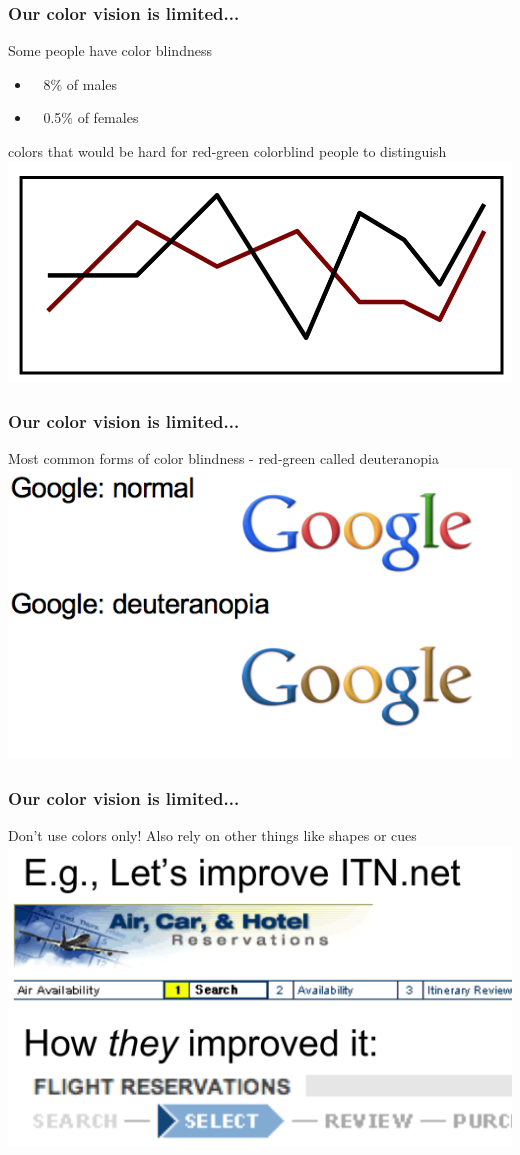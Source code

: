 \documentclass{beamer}
\begin{document}
\begin{frame}
\frametitle{Our color vision is limited...}
Some people have color blindness
\begin{itemize}
\item ~ 8\% of males
\item ~ 0.5\% of females
\end{itemize}
\vfill
\centering
colors that would be hard for red-green colorblind people to distinguish \vfill
\includegraphics[width=0.8\linewidth]{image/colorblind}
\end{frame}

\begin{frame}
\frametitle{Our color vision is limited...}
Most common forms of color blindness - red-green called deuteranopia
\vfill
\centering
\includegraphics[width=0.8\linewidth]{image/colorblind2}
\end{frame}

\begin{frame}
\frametitle{Our color vision is limited...}
Don't use colors only!  Also rely on other things like shapes or cues
\vfill
\centering
\includegraphics[width=0.8\linewidth]{image/colorblind3}
\end{frame}
\end{document}
